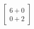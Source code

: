 \documentclass[preview]{standalone}
\begin{document}
\begin{align*}
\begin{bmatrix} 6 + 0 \\ 0 + 2 \end{bmatrix}
\end{align*}
\end{document}
